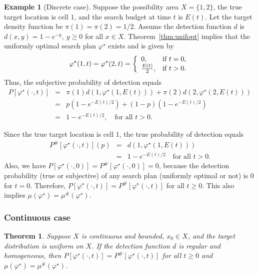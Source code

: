 \documentclass[12pt]{article}
\newtheorem{theorem}{Theorem}[section]
\theoremstyle{plain}
\theoremstyle{definition}
\newtheorem{example}{Example}%
\theoremstyle{remark}
\begin{document}
\begin{example}[Discrete case]
\label{ex:discrete1}
Suppose the possibility area $X=\{1, 2\}$, the true target location is cell $1$, and the search budget at time $t$ is $E(t)$.   Let the target density function be $\pi(1)=\pi(2)=1/2$.  Assume the detection function $d$  is  $d(x, y)=1-e^{-y}, \ y\geq 0$ for all $x\in X$.  Theorem~\ref{thm:unifopt} implies that the uniformly optimal search plan $\varphi^\star$ exists and is given by 
\[
\varphi^\star (1, t)=\varphi^\star (2, t)=\left\{
		                           \begin{array}{ll}
		                            0,  & \hbox{if $t=0$,} \\
					 \frac{E(t)}{2},  & \hbox{if $t>0$.} 
		                          \end{array}
		                         \right.
		                         \]
Thus, the subjective probability of detection equals
\begin{eqnarray*}
P[\varphi^\star(\cdot, t)] &=& \pi(1) d(1,  \varphi^\star (1, E(t)))+\pi(2)d(2, \varphi^\star (2, E(t)))\\
			&=& p \left(1-e^{- E(t)/2} \right)+(1-p)\left( 1-e^{-E(t)/2}\right) \\
			&=& 1-e^{-E(t)/2}, \quad \text{for all $t>0$}.
\end{eqnarray*}


Since the true target location is cell $1$,  the true probability of detection equals
\begin{eqnarray*}
P^{\#}[\varphi^\star(\cdot, t)] (p)&=&  d(1,  \varphi^\star (1, E(t)))\\
				&=& 1-e^{- E(t)/2}\quad \text{for all $t>0$}.			
\end{eqnarray*}
Also, we have $P[\varphi^\star(\cdot, 0)]=P^{\#}[\varphi^\star(\cdot, 0)]=0$,  because the detection probability (true or subjective) of any search plan (uniformly optimal or not) is $0$ for $t=0$.  Therefore,  $P[\varphi^\star(\cdot, t)]=P^{\#}[\varphi^\star(\cdot, t)]$ for all $t\geq 0$.  This also implies $\mu(\varphi^\star)=\mu^{\#}(\varphi^\star)$.
\end{example}


\subsubsection{Continuous case}

\begin{theorem}
\label{thm:1continuous}
Suppose $X$ is continuous and bounded, $x_0\in X$, and the target distribution is uniform on $X$.  If the detection function $d$ is regular and homogeneous, then $P[\varphi^\star(\cdot, t)]=P^{\#}[\varphi^\star(\cdot, t)]$ for all $t\geq 0$ and $\mu(\varphi^\star)=\mu^{\#}(\varphi^\star)$.
\end{theorem}
\end{document}
